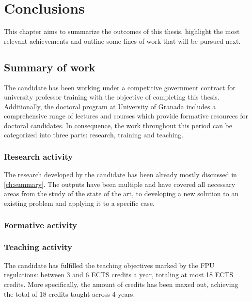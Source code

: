 \setchapterpreamble[u]{\margintoc}
\chapter{Conclusions}
\label{ch:conclusions}

This chapter aims to summarize the outcomes of this thesis, highlight the most relevant achievements and outline some lines of work that will be pursued next.

\section{Summary of work}

The candidate has been working under a competitive government contract for university professor training with the objective of completing this thesis. Additionally, the doctoral program at University of Granada includes a comprehensive range of lectures and courses which provide formative resources for doctoral candidates. In consequence, the work throughout this period can be categorized into three parts: research, training and teaching.

\subsection{Research activity}

The research developed by the candidate has been already mostly discussed in \autoref{ch:summary}. The outputs have been multiple and have covered all necessary areas from the study of the state of the art, to developing a new solution to an existing problem and applying it to a specific case.



\subsection{Formative activity}

\subsection{Teaching activity}

The candidate has fulfilled the teaching objectives marked by the FPU regulations: between 3 and 6 ECTS credits a year, totaling at most 18 ECTS credits. More specifically, the amount of credits has been maxed out, achieving the total of 18 credits taught across 4 years.

